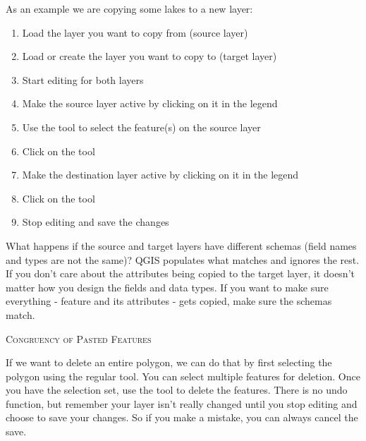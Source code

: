 As an example we are copying some lakes to a new layer:

\begin{enumerate}
\item Load the layer you want to copy from (source layer)
\item Load or create the layer you want to copy to (target layer) 
\item Start editing for both layers 
\item Make the source layer active by clicking on it in the legend 
\item Use the  tool to select the feature(s) on the source layer
\item Click on the  tool
\item Make the destination layer active by clicking on it in the legend 
\item Click on the  tool 
\item Stop editing and save the changes
\end{enumerate}

What happens if the source and target layers have
different schemas (field names and types are not the same)? QGIS populates
what matches and ignores the rest. If you don't care about the attributes
being copied to the target layer, it doesn't matter how you design the
fields and data types. If you want to make sure everything - feature and its
attributes - gets copied, make sure the schemas match.

\begin{Tip}[ht]\caption{\textsc{Congruency of Pasted Features}}
\end{Tip}


If we want to delete an entire polygon, we can do that by first selecting 
the polygon using the regular  tool. You can select 
multiple features for deletion. Once you have the selection set, use the 
 tool to delete the features. There is no undo function, 
but remember your layer isn't really changed until you stop editing and choose 
to save your changes. So if you make a mistake, you can always cancel the save.

